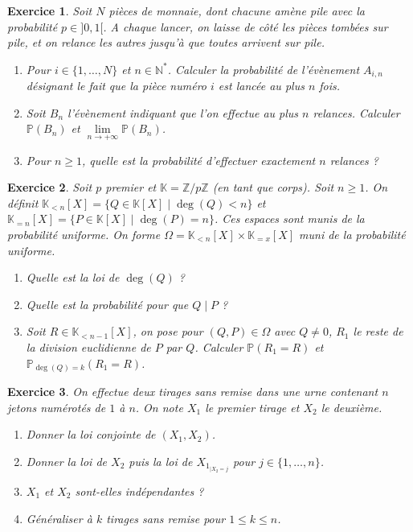 \documentclass[12pt]{article}
\newtheorem{exercise}{Exercice}[section]
\theoremstyle{remark}
\theoremstyle{remark}
\newcommand{\K}{\mathbb{K}}
\newcommand{\N}{\mathbb{N}}
\newcommand{\Z}{\mathbb{Z}}
\renewcommand{\P}{\mathbb{P}}
\begin{document}
\begin{exercise}
	Soit $N$ pièces de monnaie, dont chacune amène pile avec la probabilité
	$p\in]0,1[$. A chaque lancer, on laisse de côté les pièces tombées sur pile,
	et on relance les autres jusqu'à que toutes arrivent sur pile.
	\begin{enumerate}
		\item Pour $i\in\{1,\dots,N\}$ et $n\in\N^{*}$. Calculer la probabilité
		de l'évènement $A_{i,n}$ désignant le fait que la pièce numéro $i$ est
		lancée au plus $n$ fois.
		\item Soit $B_{n}$ l'évènement indiquant que l'on effectue au plus $n$
		relances. Calculer $\P(B_{n})$ et $\lim\limits_{n\to+\infty}\P(B_{n})$.
		\item Pour $n\geqslant1$, quelle est la probabilité d'effectuer
		exactement $n$ relances ?
	\end{enumerate}
\end{exercise}

\begin{exercise}
	Soit $p$ premier et $\K=\Z/p\Z$ (en tant que corps). Soit $n\geqslant1$. On
	définit $\K_{<n}[X]=\{Q\in\K[X]\mid \deg(Q)<n\}$ et
	$\K_{=n}[X]=\{P\in\K[X]\mid \deg(P)=n\}$.
	Ces espaces sont munis de la probabilité uniforme. On forme
	$\Omega=\K_{<n}[X]\times\K_{=x}[X]$ muni de la probabilité uniforme.
	\begin{enumerate}
		\item Quelle est la loi de $\deg(Q)$ ?
		\item Quelle est la probabilité pour que $Q\mid P$ ?
		\item Soit $R\in\K_{<n-1}[X]$, on pose pour $(Q,P)\in\Omega$ avec
		$Q\neq0$, $R_{1}$ le reste de la division euclidienne de $P$ par $Q$.
		Calculer $\P(R_{1}=R)$ et $\P_{\deg(Q)=k}(R_{1}=R)$.
	\end{enumerate}
\end{exercise}

\begin{exercise}
	On effectue deux tirages sans remise dans une urne contenant $n$ jetons
	numérotés de $1$ à $n$. On note $X_{1}$ le premier tirage et $X_{2}$ le
	deuxième.
	\begin{enumerate}
		\item Donner la loi conjointe de $(X_{1},X_{2})$.
		\item Donner la loi de $X_{2}$ puis la loi de $X_{{1}_{\mid X_{2}=j}}$
		pour $j\in\{1,\dots,n\}$.
		\item $X_{1}$ et $X_{2}$ sont-elles indépendantes ?
		\item Généraliser à $k$ tirages sans remise pour $1\leqslant k\leqslant n$.
	\end{enumerate}
\end{exercise}
\end{document}
